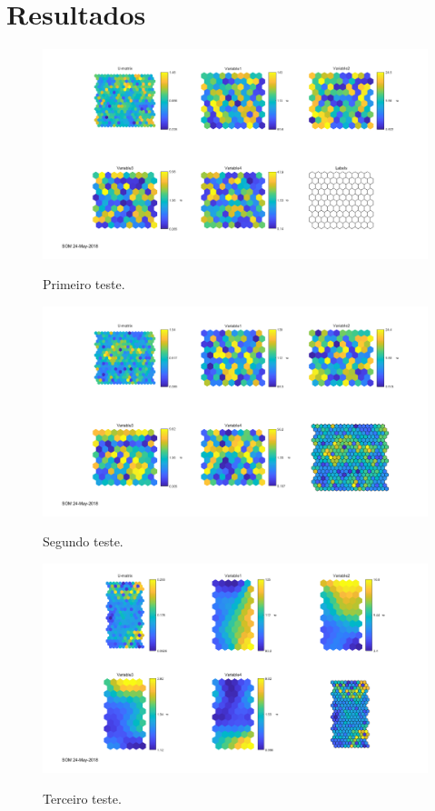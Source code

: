 \documentclass[journal, a4paper]{IEEEtran}
\begin{document}
\section{Resultados}

\begin{figure}
	\centering
	\includegraphics[scale=0.5]{Images/SOM1.png}
	\label{SOM1}
	\caption{Primeiro teste.}
\end{figure}

\begin{figure}
	\centering
	\includegraphics[scale=0.5]{Images/SOM2.png}
	\label{SOM2}
	\caption{Segundo teste.}
\end{figure}

\begin{figure}
	\centering
	\includegraphics[scale=0.5]{Images/SOM3.png}
	\label{SOM3}
	\caption{Terceiro teste.}
\end{figure}
\end{document}
